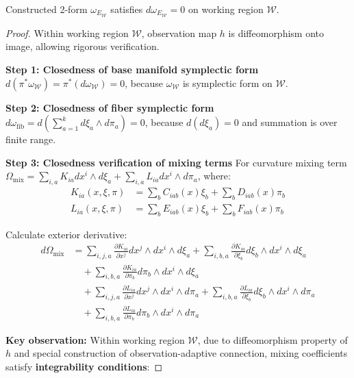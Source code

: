 \documentclass[10pt,a4paper]{amsart}
\begin{document}
\begin{lemma}
Constructed 2-form $\omega_{E_{\mathcal{W}}}$ satisfies $d\omega_{E_{\mathcal{W}}} = 0$ on working region $\mathcal{W}$.
\end{lemma}

\begin{proof}
Within working region $\mathcal{W}$, observation map $h$ is diffeomorphism onto image, allowing rigorous verification.

\textbf{Step 1: Closedness of base manifold symplectic form}
$d(\pi^*\omega_{\mathcal{W}}) = \pi^*(d\omega_{\mathcal{W}}) = 0$, because $\omega_{\mathcal{W}}$ is symplectic form on $\mathcal{W}$.

\textbf{Step 2: Closedness of fiber symplectic form}
$d\omega_{\text{fib}} = d\left(\sum_{a=1}^k d\xi_a \wedge d\pi_a\right) = 0$, because $d(d\xi_a) = 0$ and summation is over finite range.

\textbf{Step 3: Closedness verification of mixing terms}
For curvature mixing term $\Omega_{\text{mix}} = \sum_{i,a} K_{ia} dx^i \wedge d\xi_a + \sum_{i,a} L_{ia} dx^i \wedge d\pi_a$, where:
\begin{align*}
K_{ia}(x,\xi,\pi) &= \sum_b C_{iab}(x)\xi_b + \sum_b D_{iab}(x)\pi_b\\
L_{ia}(x,\xi,\pi) &= \sum_b E_{iab}(x)\xi_b + \sum_b F_{iab}(x)\pi_b
\end{align*}

Calculate exterior derivative:
\begin{align*}
d\Omega_{\text{mix}} &= \sum_{i,j,a} \frac{\partial K_{ia}}{\partial x^j} dx^j \wedge dx^i \wedge d\xi_a + \sum_{i,b,a} \frac{\partial K_{ia}}{\partial \xi_b} d\xi_b \wedge dx^i \wedge d\xi_a\\
&\quad + \sum_{i,b,a} \frac{\partial K_{ia}}{\partial \pi_b} d\pi_b \wedge dx^i \wedge d\xi_a\\
&\quad + \sum_{i,j,a} \frac{\partial L_{ia}}{\partial x^j} dx^j \wedge dx^i \wedge d\pi_a + \sum_{i,b,a} \frac{\partial L_{ia}}{\partial \xi_b} d\xi_b \wedge dx^i \wedge d\pi_a\\
&\quad + \sum_{i,b,a} \frac{\partial L_{ia}}{\partial \pi_b} d\pi_b \wedge dx^i \wedge d\pi_a
\end{align*}

\textbf{Key observation:} Within working region $\mathcal{W}$, due to diffeomorphism property of $h$ and special construction of observation-adaptive connection, mixing coefficients satisfy \textbf{integrability conditions}:


\end{proof}
\end{document}
